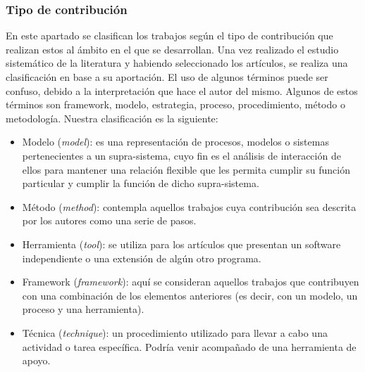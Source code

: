 \subsubsection{Tipo de contribución}
En este apartado se clasifican los trabajos según el tipo de contribución que realizan estos al ámbito en el que se desarrollan. Una vez realizado el estudio sistemático de la literatura y habiendo seleccionado los artículos, se realiza una clasificación en base a su aportación. El uso de algunos términos puede ser confuso, debido a la interpretación que hace el autor del mismo. Algunos de estos términos son framework, modelo, estrategia, proceso, procedimiento, método o metodología. Nuestra clasificación es la siguiente:
\begin{itemize}
\item Modelo (\emph{model}): es una representación de procesos, modelos o sistemas pertenecientes a un supra-sistema, cuyo fin es el análisis de interacción de ellos para mantener una relación flexible que les permita cumplir su función particular y cumplir la función de dicho supra-sistema.
\item Método (\emph{method}): contempla aquellos trabajos cuya contribución sea descrita por los autores como una serie de pasos.
\item Herramienta (\emph{tool}): se utiliza para los artículos que presentan un software independiente o una extensión de algún otro programa.
\item Framework (\emph{framework}): aquí se consideran aquellos trabajos que contribuyen con una combinación de los elementos anteriores (es decir, con un modelo, un proceso y una herramienta).
\item Técnica (\emph{technique}): un procedimiento utilizado para llevar a cabo una actividad o tarea específica. Podría venir acompañado de una herramienta de apoyo.
\end{itemize}

